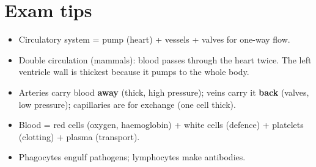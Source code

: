 \documentclass[11pt]{article}
\begin{document}
\section*{Exam tips}

\begin{itemize}
\item Circulatory system = pump (heart) + vessels + valves for one-way flow.

\item Double circulation (mammals): blood passes through the heart twice. The left ventricle wall is thickest because it pumps to the whole body.

\item Arteries carry blood \textbf{away} (thick, high pressure); veins carry it \textbf{back} (valves, low pressure); capillaries are for exchange (one cell thick).

\item Blood = red cells (oxygen, haemoglobin) + white cells (defence) + platelets (clotting) + plasma (transport).

\item Phagocytes engulf pathogens; lymphocytes make antibodies.

\end{itemize}
\end{document}
